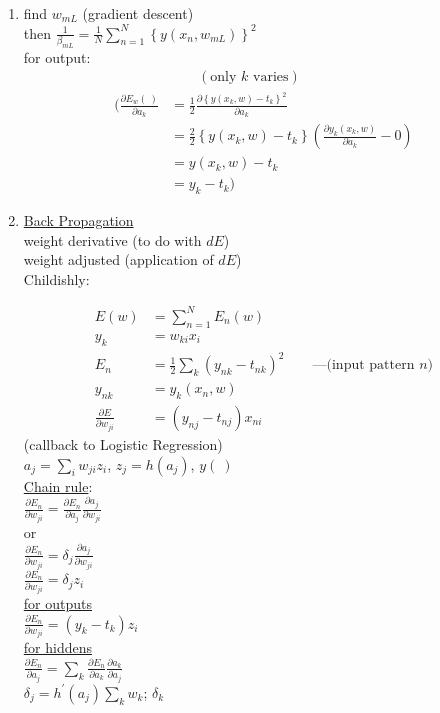 \begin{enumerate}[label=\arabic*)]
\item find $w_{mL}$ (gradient descent)\\
then $\frac{1}{\beta_{mL}} = \frac{1}{N}\sum_{n=1}^{N} \left\{ y( x_n, w_{mL} ) \right\}^2$\\
for output: 
\begin{align*}
& \qquad (\text{only\ }k\text{\ varies}) \\
\Biggl( \frac{\partial E_w(\:)}{\partial a_k} & = \frac{1}{2} \frac{ \partial \left\{  y( x_k, w )- t_k \right\}^2}{\partial a_k} \\
& = \frac{2}{2} \left\{ y( x_k, w ) - t_k \right\} \left( \frac{\partial y_k( x_k, w )}{\partial a_k} - 0 \right) \\
& = y( x_k, w ) - t_k \\
& = y_k - t_k \Biggr)
\end{align*}

\item \underline{Back Propagation}\\

 weight derivative (to do with $dE$)\\

 weight adjusted (application of $dE$)\\

Childishly:

\begin{align*}
E(w) & = \sum_{n=1}^{N} E_n( w ) \\
y_k & = w_{ki} x_i \\
E_n & = \frac{1}{2} \sum_{k} ( y_{nk} - t_{nk} )^2 \qquad \text{---(input\ pattern\ }n\text{)} \\
y_{nk} & = y_k( x_n, w ) \\
\frac{\partial E}{\partial w_{ji}} & = ( y_{nj} - t_{nj} )x_{ni}
\end{align*}
(callback to Logistic Regression)\\
$a_j = \sum_{i} w_{ji} z_i$, $z_j = h(a_j)$, $y(\ )$\\

\underline{Chain rule}:\\
$\frac{\partial E_n}{\partial w_{ji}}=\frac{\partial E_n}{\partial a_j}\frac{\partial a_j}{\partial w_{ji}}$ \\
or\\
$\frac{\partial E_n}{\partial w_{ji}}=\delta_j \frac{\partial a_j}{\partial w_{ji}}$\\
$\frac{\partial E_n}{\partial w_{ji}}=\delta_j z_i$\\

\underline{for outputs} \\
$\frac{\partial E_n}{\partial w_{ji}} = ( y_k - t_k )z_i$\\

\underline{for hiddens} \\
$\frac{\partial E_n}{\partial a_j} = \sum_{k} \frac{\partial E_n}{\partial a_k}\frac{\partial a_k}{\partial a_j}$\\
$\delta_j = h^\prime(a_j)\sum_{k}w_k$; $\delta_k$


\end{enumerate}